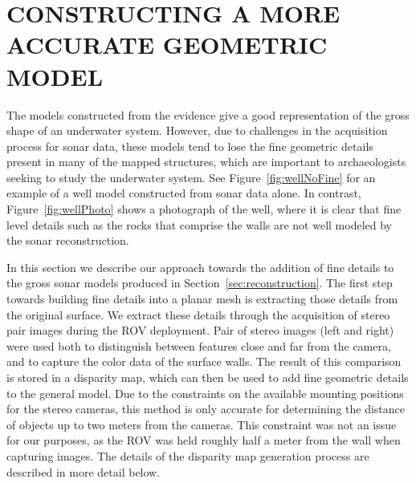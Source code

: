 \documentclass[a4paper,twoside]{article}
\begin{document}

\section{\uppercase{Constructing a more accurate geometric model}}
\label{sec:detail}

\noindent The models constructed from the evidence give a good representation of the gross shape of an underwater system. However, due to challenges in the acquisition process for sonar data, these models tend to lose the fine geometric details present in many of the mapped structures, which are important to archaeologists seeking to study the underwater system. See Figure~\ref{fig:wellNoFine} for an example of a well model constructed from sonar data alone. In contrast, Figure~\ref{fig:wellPhoto} shows a photograph of the well, where it is clear that fine level details such as the rocks that comprise the walls are not well modeled by the sonar reconstruction.

In this section we describe our approach towards the addition of fine details to the gross sonar models produced in Section~\ref{sec:reconstruction}.
The first step towards building fine details into a planar mesh is extracting those details from the original surface. 
We extract these details through the acquisition of stereo pair images during the ROV deployment.
Pair of stereo images (left and right) were used both to distinguish between features close and far from the camera, and to capture the color data of the surface walls.
The result of this comparison is stored in a disparity map, which can then be used to add fine geometric details to the general model.  
Due to the constraints on the available mounting positions for the stereo cameras, this method is only accurate for determining the distance of objects up to two meters from the cameras. This constraint was not an issue for our purposes, as the ROV was held roughly half a meter from the wall when capturing images.
The details of the disparity map generation process are described in more detail below.
\end{document}

